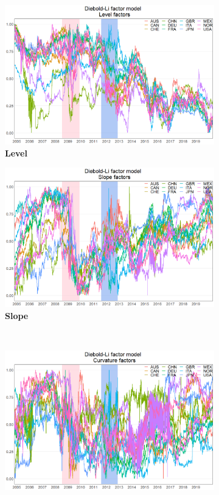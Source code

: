 \documentclass[12pt,bibliography=totoc]{article}
\begin{document}
\begin{figure}[H]
\centering

\begin{subfigure}{.5\linewidth}
\centering
\includegraphics[width=\linewidth]{levels}
\caption{\textbf{Level}}

\end{subfigure}%
\begin{subfigure}{.5\linewidth}
\centering
\includegraphics[width=\linewidth]{slopes}
\caption{\textbf{Slope}}
\end{subfigure}\\[1ex]
\begin{subfigure}{.5\linewidth}
\centering
\includegraphics[width=\linewidth]{curvatures}


\end{subfigure}
\end{figure}
\end{document}
